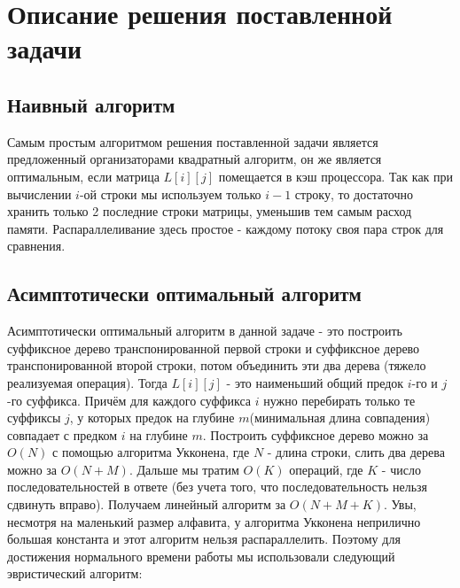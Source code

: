 \documentclass[12pt,a4paper]{article}
\begin{document}
\section{Описание решения поставленной задачи}
\subsection{Наивный алгоритм}
Самым простым алгоритмом решения поставленной задачи является предложенный организаторами квадратный алгоритм, он же является оптимальным, если матрица $L[i][j]$ помещается в кэш процессора. Так как при вычислении $i$-ой строки мы используем только $i - 1$ строку, то достаточно хранить только 2 последние строки матрицы, уменьшив тем самым расход памяти. Распараллеливание здесь простое - каждому потоку своя пара строк для сравнения.

\subsection{Асимптотически оптимальный алгоритм}
Асимптотически оптимальный алгоритм в данной задаче - это построить суффиксное дерево транспонированной первой строки и суффиксное дерево транспонированной второй строки, потом объединить эти два дерева (тяжело реализуемая операция). Тогда $L[i][j]$ - это наименьший общий предок $i$-го и $j$-го суффикса. Причём для каждого суффикса $i$ нужно перебирать только те суффиксы $j$, у которых предок на глубине $m$(минимальная длина совпадения) совпадает с предком $i$ на глубине $m$. Построить суффиксное дерево можно за $O(N)$ с помощью алгоритма Укконена, где $N$ - длина строки, слить два дерева можно за $O(N+M)$. Дальше мы тратим $O(K)$ операций, где $K$ - число последовательностей в ответе (без учета того, что последовательность нельзя сдвинуть вправо).
Получаем линейный алгоритм за $O(N + M + K)$. Увы, несмотря на маленький размер алфавита, у алгоритма Укконена неприлично большая константа и этот алгоритм нельзя распараллелить. Поэтому для достижения нормального времени работы мы использовали следующий эвристический алгоритм:
\end{document}
